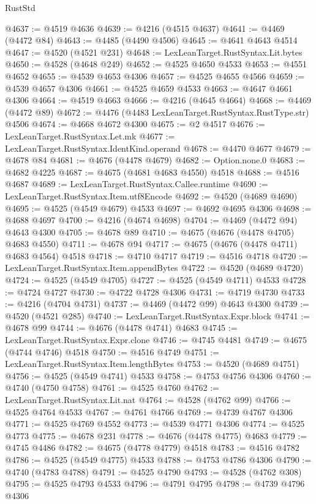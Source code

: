 \begin{lexlean}{RustStd}
\begin{coremodule}
@4637 := @4519 @4636
@4639 := @4216 (@4515 @4637)
@4641 := @4469 (@4472 @84)
@4643 := @4485 (@4490 @4506)
@4645 := @4641 @4643 @4514
@4647 := @4520 (@4521 @231)
@4648 := LexLeanTarget.RustSyntax.Lit.bytes
@4650 := @4528 (@4648 @249)
@4652 := @4525 @4650 @4533
@4653 := @4551 @4652
@4655 := @4539 @4653 @4306
@4657 := @4525 @4655 @4566
@4659 := @4539 @4657 @4306
@4661 := @4525 @4659 @4533
@4663 := @4647 @4661 @4306
@4664 := @4519 @4663
@4666 := @4216 (@4645 @4664)
@4668 := @4469 (@4472 @89)
@4672 := @4476 (@4483 LexLeanTarget.RustSyntax.RustType.str) @4506
@4674 := @4668 @4672 @4300
@4675 := @2 @4517
@4676 := LexLeanTarget.RustSyntax.Let.mk
@4677 := LexLeanTarget.RustSyntax.IdentKind.operand
@4678 := @4470 @4677
@4679 := @4678 @84
@4681 := @4676 (@4478 @4679)
@4682 := Option.none.{0}
@4683 := @4682 @4225
@4687 := @4675 (@4681 @4683 @4550) @4518
@4688 := @4516 @4687
@4689 := LexLeanTarget.RustSyntax.Callee.runtime
@4690 := LexLeanTarget.RustSyntax.Item.utf8Encode
@4692 := @4520 (@4689 @4690)
@4695 := @4525 (@4549 @4679) @4533
@4697 := @4692 @4695 @4306
@4698 := @4688 @4697
@4700 := @4216 (@4674 @4698)
@4704 := @4469 (@4472 @94) @4643 @4300
@4705 := @4678 @89
@4710 := @4675 (@4676 (@4478 @4705) @4683 @4550)
@4711 := @4678 @94
@4717 := @4675 (@4676 (@4478 @4711) @4683 @4564) @4518
@4718 := @4710 @4717
@4719 := @4516 @4718
@4720 := LexLeanTarget.RustSyntax.Item.appendBytes
@4722 := @4520 (@4689 @4720)
@4724 := @4525 (@4549 @4705)
@4727 := @4525 (@4549 @4711) @4533
@4728 := @4724 @4727
@4730 := @4722 @4728 @4306
@4731 := @4719 @4730
@4733 := @4216 (@4704 @4731)
@4737 := @4469 (@4472 @99) @4643 @4300
@4739 := @4520 (@4521 @285)
@4740 := LexLeanTarget.RustSyntax.Expr.block
@4741 := @4678 @99
@4744 := @4676 (@4478 @4741) @4683
@4745 := LexLeanTarget.RustSyntax.Expr.clone
@4746 := @4745 @4481
@4749 := @4675 (@4744 @4746) @4518
@4750 := @4516 @4749
@4751 := LexLeanTarget.RustSyntax.Item.lengthBytes
@4753 := @4520 (@4689 @4751)
@4756 := @4525 (@4549 @4741) @4533
@4758 := @4753 @4756 @4306
@4760 := @4740 (@4750 @4758)
@4761 := @4525 @4760
@4762 := LexLeanTarget.RustSyntax.Lit.nat
@4764 := @4528 (@4762 @99)
@4766 := @4525 @4764 @4533
@4767 := @4761 @4766
@4769 := @4739 @4767 @4306
@4771 := @4525 @4769 @4552
@4773 := @4539 @4771 @4306
@4774 := @4525 @4773
@4775 := @4678 @231
@4778 := @4676 (@4478 @4775) @4683
@4779 := @4745 @4486
@4782 := @4675 (@4778 @4779) @4518
@4783 := @4516 @4782
@4786 := @4525 (@4549 @4775) @4533
@4788 := @4753 @4786 @4306
@4790 := @4740 (@4783 @4788)
@4791 := @4525 @4790
@4793 := @4528 (@4762 @308)
@4795 := @4525 @4793 @4533
@4796 := @4791 @4795
@4798 := @4739 @4796 @4306

\end{coremodule}
\end{lexlean}
